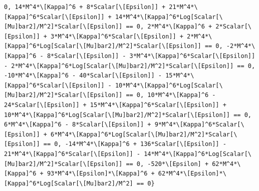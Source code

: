 \documentclass[11pt]{article}
\begin{document}
\begin{verbatim}
0, 14*M^4*\[Kappa]^6 + 8*Scalar[\[Epsilon]] + 21*M^4*\[Kappa]^6*Scalar[\[Epsilon]] + 14*M^4*\[Kappa]^6*Log[Scalar[\[Mu]bar2]/M^2]*Scalar[\[Epsilon]] == 0, 2*M^4*\[Kappa]^6 + 2*Scalar[\[Epsilon]] + 3*M^4*\[Kappa]^6*Scalar[\[Epsilon]] + 2*M^4*\[Kappa]^6*Log[Scalar[\[Mu]bar2]/M^2]*Scalar[\[Epsilon]] == 0, -2*M^4*\[Kappa]^6 - 8*Scalar[\[Epsilon]] - 3*M^4*\[Kappa]^6*Scalar[\[Epsilon]] - 2*M^4*\[Kappa]^6*Log[Scalar[\[Mu]bar2]/M^2]*Scalar[\[Epsilon]] == 0, -10*M^4*\[Kappa]^6 - 40*Scalar[\[Epsilon]] - 15*M^4*\[Kappa]^6*Scalar[\[Epsilon]] - 10*M^4*\[Kappa]^6*Log[Scalar[\[Mu]bar2]/M^2]*Scalar[\[Epsilon]] == 0, 10*M^4*\[Kappa]^6 - 24*Scalar[\[Epsilon]] + 15*M^4*\[Kappa]^6*Scalar[\[Epsilon]] + 10*M^4*\[Kappa]^6*Log[Scalar[\[Mu]bar2]/M^2]*Scalar[\[Epsilon]] == 0, 6*M^4*\[Kappa]^6 - 8*Scalar[\[Epsilon]] + 9*M^4*\[Kappa]^6*Scalar[\[Epsilon]] + 6*M^4*\[Kappa]^6*Log[Scalar[\[Mu]bar2]/M^2]*Scalar[\[Epsilon]] == 0, -14*M^4*\[Kappa]^6 + 136*Scalar[\[Epsilon]] - 21*M^4*\[Kappa]^6*Scalar[\[Epsilon]] - 14*M^4*\[Kappa]^6*Log[Scalar[\[Mu]bar2]/M^2]*Scalar[\[Epsilon]] == 0, -520*\[Epsilon] + 62*M^4*\[Kappa]^6 + 93*M^4*\[Epsilon]*\[Kappa]^6 + 62*M^4*\[Epsilon]*\[Kappa]^6*Log[Scalar[\[Mu]bar2]/M^2] == 0}
\end{verbatim}
\end{document}
